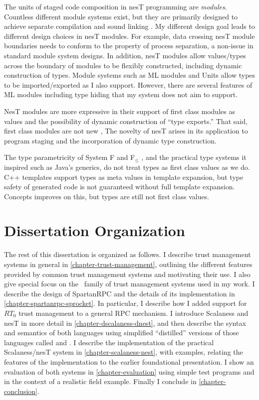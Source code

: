 The units of staged code composition in nesT programming are \emph{modules}. Countless different
module systems exist, but they are primarily designed to achieve separate compilation and sound
linking \cite{Cardelli-1997}. My different design goal leads to different design choices in nesT
modules. For example, data crossing nesT module boundaries needs to conform to the property of
process separation, a non-issue in standard module system designs. In addition, nesT modules
allow values/types across the boundary of modules to be flexibly constructed, including dynamic
construction of types. Module systems such as ML modules \cite{macqueen84} and Units
\cite{flatt98units} allow types to be imported/exported as I also support. However, there are
several features of ML modules including type hiding that my system does not aim to support.

NesT modules are more expressive in their support of first class modules as values and the
possibility of dynamic construction of ``type exports.'' That said, first class modules are not
new \cite{99620,ancona01calculus}, The novelty of nesT arises in its application to program
staging and the incorporation of dynamic type construction.

The type parametricity of System F and F$_\le$ \cite{Cardelli-1985}, and the practical type
systems it inspired such as Java's generics, do not treat types as first class values as we do.
C++ templates support types as meta values in template expansion, but type safety of generated
code is not guaranteed without full template expansion. Concepts \cite{gregor06:_concepts}
improves on this, but types are still not first class values.

\section{Dissertation Organization}

The rest of this dissertation is organized as follows. I describe trust management systems in
general in \autoref{chapter-trust-management}, outlining the different features provided by
common trust management systems and motivating their use. I also give special focus on the \RT\
family of trust management systems used in my work. I describe the design of SpartanRPC and the
details of its implementation in \autoref{chapter-spartanrpc-sprocket}. In particular, I
describe how I added support for $RT_0$ trust management to a general RPC mechanism. I introduce
Scalaness and nesT in more detail in \autoref{chapter-dscalaness-dnest}, and then describe the
syntax and semantics of both languages using simplified ``distilled'' versions of those
languages called \newterm{DScalaness} and \newterm{DnesT}. I describe the implementation of the
practical Scalaness/nesT system in \autoref{chapter-scalaness-nest}, with examples, relating the
features of the implementation to the earlier foundational presentation. I show an evaluation of
both systems in \autoref{chapter-evaluation} using simple test programs and in the context of a
realistic field example. Finally I conclude in \autoref{chapter-conclusion}.


